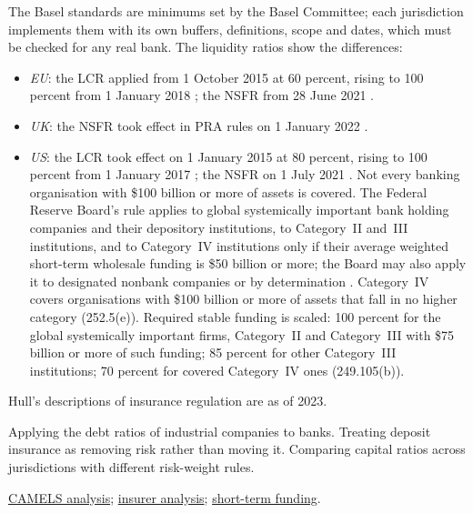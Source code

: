 \begin{qfdefinition}
 The Basel standards are minimums set by the Basel Committee; each jurisdiction implements them with its own buffers, definitions, scope and dates, which must be checked for any real bank. The liquidity ratios show the differences:
\begin{itemize}
\item \emph{EU}: the LCR applied from 1 October 2015 at 60 percent, rising to 100 percent from 1 January 2018 \citep[Arts~38--39]{eu-2015-61-lcr}; the NSFR from 28 June 2021 \citep[Art.~3(2)]{eu-2019-876-crr2}.
\item \emph{UK}: the NSFR took effect in PRA rules on 1 January 2022 \citep[pp.~4 and~8]{pra-ps17-21-basel-2021}.
\item \emph{US}: the LCR took effect on 1 January 2015 at 80 percent, rising to 100 percent from 1 January 2017 \citep[p.~61444]{us-lcr-rule-2014}; the NSFR on 1 July 2021 \citep[p.~9120]{us-nsfr-rule-2021}. Not every banking organisation with \$100 billion or more of assets is covered. The Federal Reserve Board's rule applies to global systemically important bank holding companies and their depository institutions, to Category~II and~III institutions, and to Category~IV institutions only if their average weighted short-term wholesale funding is \$50 billion or more; the Board may also apply it to designated nonbank companies or by determination \citep[12 CFR 249.1(b)(1)]{ecfr-12cfr249-2026}. Category~IV covers organisations with \$100 billion or more of assets that fall in no higher category (252.5(e)). Required stable funding is scaled: 100 percent for the global systemically important firms, Category~II and Category~III with \$75 billion or more of such funding; 85 percent for other Category~III institutions; 70 percent for covered Category~IV ones (249.105(b)).
\end{itemize}
Hull's descriptions of insurance regulation are as of 2023.

 Applying the debt ratios of industrial companies to banks. Treating deposit insurance as removing risk rather than moving it. Comparing capital ratios across jurisdictions with different risk-weight rules.

 \hyperref[meth:bank-camels-analysis]{CAMELS analysis}; \hyperref[meth:insurer-analysis]{insurer analysis}; \hyperref[def:short-term-funding-repo]{short-term funding}.

\end{qfdefinition}

